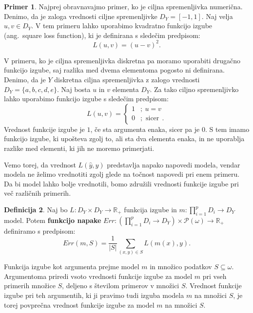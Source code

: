 \documentclass[12pt,a4paper,twoside]{article}
\theoremstyle{definition} %
\newtheorem{definicija}{Definicija}[section]
\newtheorem{primer}[definicija]{Primer}
\theoremstyle{plain} %
\numberwithin{equation}{section}  %
\begin{document}
\begin{primer}
Najprej obravnavajmo primer, ko je ciljna spremenljivka numerična. Denimo, da je zaloga vrednosti ciljne spremenljivke $D_Y = [-1,1]$. Naj velja $u, v \in  D_Y$. V tem primeru lahko uporabimo kvadratno funkcijo izgube (ang.~square loss function), ki je definirana s sledečim predpisom:
$$
L(u,v) = (u - v)^2.
$$

V primeru, ko je ciljna spremenljivka diskretna pa moramo uporabiti drugačno funkcijo izgube, saj razlika med dvema elementoma pogosto ni definirana. 
Denimo, da je $Y$ diskretna ciljna spremenljivka z zalogo vrednosti $D_Y = \{a,b,c,d,e\}$. 
Naj bosta $u$ in $v$ elementa $D_Y$. Za tako ciljno spremenljivko lahko uporabimo funkcijo izgube s sledečim predpisom:
\[
L(u,v) =
\begin{cases}
1 &;\ u= v \\
0 &; \text{ sicer}\ \ .
\end{cases}
\]
Vrednost funkcije izgube je $1$, če sta argumenta enaka, sicer pa je $0$. S tem imamo funkcijo izgube, ki upošteva zgolj to, ali sta dva elementa enaka, in ne uporablja razlike med elementi, ki jih ne moremo primerjati.
\end{primer}

Vemo torej, da vrednost $L(\hat{y}, y)$ predstavlja napako napovedi modela, vendar modela ne želimo vrednotiti zgolj glede na točnost napovedi pri enem primeru. Da bi model lahko bolje vrednotili, bomo združili vrednosti funkcije izgube pri več različnih primerih.

\begin{definicija}
\label{def-funkcija-napake}
Naj bo $L: D_Y \times D_Y \rightarrow \mathbb{R}_+$ funkcija izgube in $m: \prod_{i=1}^p D_i \rightarrow D_Y$ model. Potem \textbf{funkcijo napake} $Err: (\prod_{i=1}^p D_i \rightarrow D_Y) \times \mathcal P (\omega) \rightarrow \mathbb{R}_+$ definiramo s predpisom:
\[
Err(m,S) = \frac{1}{|S|} \sum_{(x,y) \in S} L(m(x),y).
\]
\end{definicija}

Funkcija izgube kot argumenta prejme model $m$ in množico podatkov $S \subseteq \omega$. Argumentoma priredi vsoto vrednosti funkcije izgube za model $m$ pri vseh primerih množice $S$, deljeno s številom primerov v množici $S$. Vrednost funkcije izgube pri teh argumentih, ki ji pravimo tudi izguba modela $m$ na množici $S$, je torej povprečna vrednost funkcije izgube za model $m$ na množici $S$.
\end{document}
